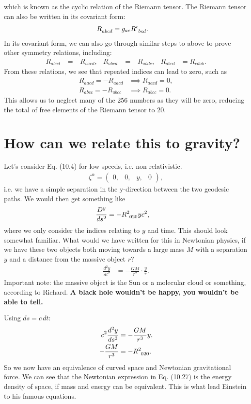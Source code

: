 \documentclass[a4paper, 11pt, normalem]{report}
\begin{document}
which is known as the cyclic relation of the Riemann tensor.
The Riemann tensor can also be written in its covariant form:
\begin{align}
    \tensor{R}{_{abcd}} &= g_{ae}\tensor{R}{^e_{bcd}}.
\end{align}
In its covariant form, we can also go through similar steps to above to prove other symmetry relations, including:
\begin{align}
    R_{abcd} &= -R_{bacd}, & R_{abcd} &= -R_{abdc}, & R_{abcd} &= R_{cdab}.
\end{align}
From these relations, we see that repeated indices can lead to zero, such as
\begin{align}
    R_{aacd} = -R_{aacd} &\implies R_{aacd} = 0, \\
    R_{abcc} = -R_{abcc} &\implies R_{abcc} = 0.
\end{align}
This allows us to neglect many of the 256 numbers as they will be zero, reducing the total of free elements of the Riemann tensor to 20.

\section{How can we relate this to gravity?}
Let's consider Eq. (10.4) for low speeds, i.e. non-relativistic.
\begin{align}
    \zeta^\alpha = \begin{pmatrix} 0, & 0, & y, & 0 \end{pmatrix},
\end{align}
i.e. we have a simple separation in the y-direction between the two geodesic paths.
We would then get something like
\begin{align}
    \frac{D^y}{ds^2} &= -\tensor{R}{^2_{020}}yc^2,
\end{align}
where we only consider the indices relating to $y$ and time.
This should look somewhat familiar.
What would we have written for this in Newtonian physics, if we have these two objects both moving towards a large mass $M$ with a separation $y$ and a distance from the massive object $r$?
\begin{align}
    \frac{d^2y}{dt^2} &= -\frac{GM}{r^2}\cdot\frac{y}{r}.
\end{align}
Important note: the massive object is the Sun or a molecular cloud or something, according to Richard.
\textbf{A black hole wouldn't be happy, you wouldn't be able to tell.}

Using $ds=c\,dt$:
\begin{align}
    c^2\frac{d^2y}{ds^2} &= -\frac{GM}{r^3}y,\\
    -\frac{GM}{r^3} &= -\tensor{R}{^2_{020}}.
\end{align}
So we now have an equivalence of curved space and Newtonian gravitational force.
We can see that the Newtonian expression in Eq. (10.27) is the energy density of space, if mass and energy can be equivalent.
This is what lead Einstein to his famous equations.
\end{document}
